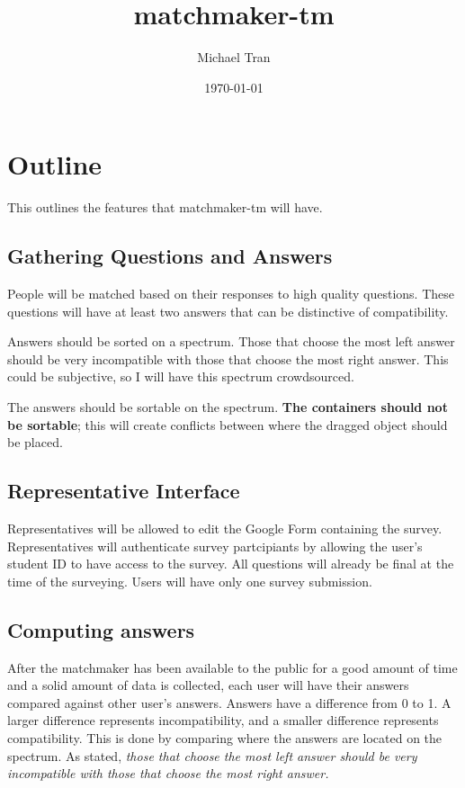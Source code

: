 \documentclass[12pt]{article}
\title{matchmaker-tm}
\author{Michael Tran}
\date{\today}
\begin{document}
\maketitle

\section{Outline}
This outlines the features that matchmaker-tm will have.

\subsection{Gathering Questions and Answers}
People will be matched based on their responses to high quality questions. These
questions will have at least two answers that can be distinctive of
compatibility.

Answers should be sorted on a spectrum. Those that choose the most left answer
should be very incompatible with those that choose the most right answer. This
could be subjective, so I will have this spectrum crowdsourced.

The answers should be sortable on the spectrum. \textbf{The containers should
not be sortable}; this will create conflicts between where the dragged object
should be placed.

\subsection{Representative Interface}
Representatives will be allowed to edit the Google Form containing the survey.
Representatives will authenticate survey partcipiants by allowing the user's
student ID to have access to the survey. All questions will already be final at
the time of the surveying. Users will have only one survey submission.

\subsection{Computing answers}
After the matchmaker has been available to the public for a good amount of time
and a solid amount of data is collected, each user will have their answers
compared against other user's answers. Answers have a difference from 0 to
1. A larger difference represents incompatibility, and a smaller difference
represents compatibility. This is done by comparing where the answers are
located on the spectrum. As stated, \textit{those that choose the most left answer
should be very incompatible with those that choose the most right answer.}
\end{document}
